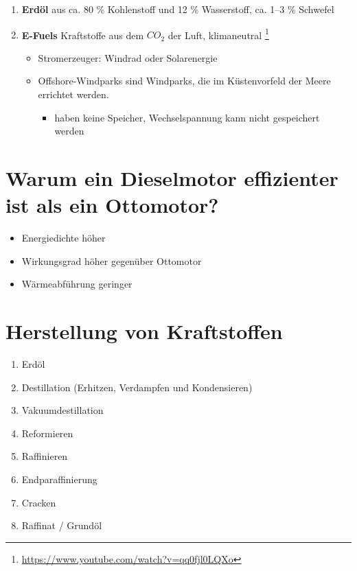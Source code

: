 \begin{enumerate}
\item
  \textbf{Erdöl} aus ca. 80 \% Kohlenstoff und 12 \% Wasserstoff, ca.
  1--3 \% Schwefel
\item
  \textbf{E-Fuels} Kraftstoffe aus dem $CO_2$ der Luft, klimaneutral
  \footnote{\url{https://www.youtube.com/watch?v=qq0fjl0LQXo}}

  \begin{itemize}
  \item
    Stromerzeuger: Windrad oder Solarenergie
  \item
    Offshore-Windparks sind Windparks, die im Küstenvorfeld der Meere
    errichtet werden.

    \begin{itemize}
    \item
      haben keine Speicher, Wechselspannung kann nicht gespeichert
      werden
    \end{itemize}
  \end{itemize}
\end{enumerate}

\section{Warum ein Dieselmotor effizienter ist als ein
Ottomotor?}\label{warum-ein-dieselmotor-effizienter-ist-als-ein-ottomotor}

\begin{itemize}
\item
  Energiedichte höher
\item
  Wirkungsgrad höher gegenüber Ottomotor
\item
  Wärmeabführung geringer
\end{itemize}

\section{Herstellung von
Kraftstoffen}\label{herstellung-von-kraftstoffen}

\begin{enumerate}
\item
  Erdöl
\item
  Destillation (Erhitzen, Verdampfen und Kondensieren)
\item
  Vakuumdestillation
\item
  Reformieren
\item
  Raffinieren
\item
  Endparaffinierung\\
\item
  Cracken
\item
  Raffinat / Grundöl
\end{enumerate}


